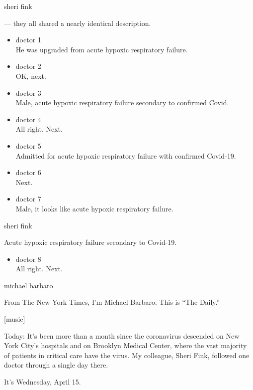 sheri fink

--- they all shared a nearly identical description.

\begin{itemize}
\item
  doctor 1\\
  He was upgraded from acute hypoxic respiratory failure.
\item
  doctor 2\\
  OK, next.
\item
  doctor 3\\
  Male, acute hypoxic respiratory failure secondary to confirmed Covid.
\item
  doctor 4\\
  All right. Next.
\item
  doctor 5\\
  Admitted for acute hypoxic respiratory failure with confirmed
  Covid-19.
\item
  doctor 6\\
  Next.
\item
  doctor 7\\
  Male, it looks like acute hypoxic respiratory failure.
\end{itemize}

sheri fink

Acute hypoxic respiratory failure secondary to Covid-19.

\begin{itemize}
\tightlist
\item
  doctor 8\\
  All right. Next.
\end{itemize}

michael barbaro

From The New York Times, I'm Michael Barbaro. This is ``The Daily.''

{[}music{]}

Today: It's been more than a month since the coronavirus descended on
New York City's hospitals and on Brooklyn Medical Center, where the vast
majority of patients in critical care have the virus. My colleague,
Sheri Fink, followed one doctor through a single day there.

It's Wednesday, April 15.

